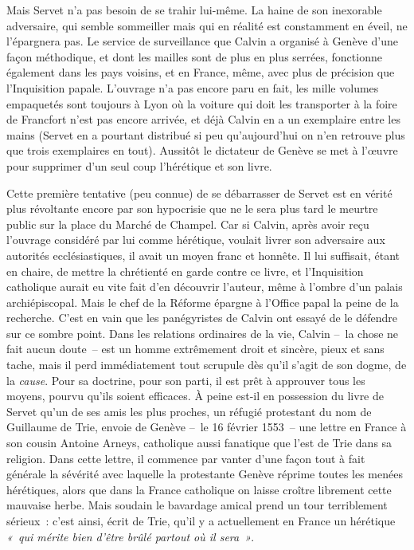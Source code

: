 \documentclass[french,twoside]{book} %
\begin{document}
\noindent Mais Servet n’a pas besoin de se trahir lui-même. La haine de son inexorable adversaire, qui semble sommeiller mais qui en réalité est constamment en éveil, ne l’épargnera pas. Le service de surveillance que Calvin a organisé à Genève d’une façon méthodique, et dont les mailles sont de plus en plus serrées, fonctionne également dans les pays voisins, et en France, même, avec plus de précision que l’Inquisition papale. L’ouvrage n’a pas encore paru en fait, les mille volumes empaquetés sont toujours à Lyon où la voiture qui doit les transporter à la foire de Francfort n’est pas encore arrivée, et déjà Calvin en a un exemplaire entre les mains (Servet en a pourtant distribué si peu qu’aujourd’hui on n’en retrouve plus que trois exemplaires en tout). Aussitôt le dictateur de Genève se met à l’œuvre pour supprimer d’un seul coup l’hérétique et son livre.\par
Cette première tentative (peu connue) de se débarrasser de Servet est en vérité plus révoltante encore par son hypocrisie que ne le sera plus tard le meurtre public sur la place du Marché de Champel. Car si Calvin, après avoir reçu l’ouvrage considéré par lui comme hérétique, voulait livrer son adversaire aux autorités ecclésiastiques, il avait un moyen franc et honnête. Il lui suffisait, étant en chaire, de mettre la chrétienté en garde contre ce livre, et l’Inquisition catholique aurait eu vite fait d’en découvrir l’auteur, même à l’ombre d’un palais archiépiscopal. Mais le chef de la Réforme épargne à l’Office papal la peine de la recherche. C’est en vain que les panégyristes de Calvin ont essayé de le défendre sur ce sombre point. Dans les relations ordinaires de la vie, Calvin – la chose ne fait aucun doute – est un homme extrêmement droit et sincère, pieux et sans tache, mais il perd immédiatement tout scrupule dès qu’il s’agit de son dogme, de la \emph{cause}. Pour sa doctrine, pour son parti, il est prêt à approuver tous les moyens, pourvu qu’ils soient efficaces. À peine est-il en possession du livre de Servet qu’un de ses amis les plus proches, un réfugié protestant du nom de Guillaume de Trie, envoie de Genève – le 16 février 1553 – une lettre en France à son cousin Antoine Arneys, catholique aussi fanatique que l’est de Trie dans sa religion. Dans cette lettre, il commence par vanter d’une façon tout à fait générale la sévérité avec laquelle la protestante Genève réprime toutes les menées hérétiques, alors que dans la France catholique on laisse croître librement cette mauvaise herbe. Mais soudain le bavardage amical prend un tour terriblement sérieux : c’est ainsi, écrit de Trie, qu’il y a actuellement en France un hérétique \emph{« qui mérite bien d’être brûlé partout où il sera »}.\par
\end{document}
